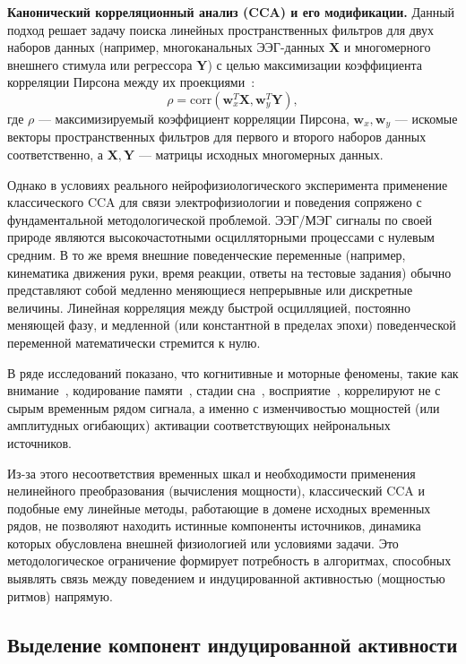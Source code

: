 \textbf{Канонический корреляционный анализ (CCA) и его модификации.} 
Данный подход решает задачу поиска линейных пространственных фильтров для двух наборов данных (например, многоканальных ЭЭГ-данных $\mathbf{X}$ и многомерного внешнего стимула или регрессора $\mathbf{Y}$) с целью максимизации коэффициента корреляции Пирсона между их проекциями~\cite{thompson1984canonical}:
\begin{equation}
	\rho = \text{corr}(\mathbf{w}_x^T \mathbf{X}, \mathbf{w}_y^T \mathbf{Y}),
\end{equation}
где $\rho$ --- максимизируемый коэффициент корреляции Пирсона, $\mathbf{w}_x, \mathbf{w}_y$ --- искомые векторы пространственных фильтров для первого и второго наборов данных соответственно, а $\mathbf{X}, \mathbf{Y}$ --- матрицы исходных многомерных данных.

Однако в условиях реального нейрофизиологического эксперимента применение классического CCA для связи электрофизиологии и поведения сопряжено с фундаментальной методологической проблемой. ЭЭГ/МЭГ сигналы по своей природе являются высокочастотными осцилляторными процессами с нулевым средним. В то же время внешние поведенческие переменные (например, кинематика движения руки, время реакции, ответы на тестовые задания) обычно представляют собой медленно меняющиеся непрерывные или дискретные величины. Линейная корреляция между быстрой осцилляцией, постоянно меняющей фазу, и медленной (или константной в пределах эпохи) поведенческой переменной математически стремится к нулю.

В ряде исследований показано, что когнитивные и моторные феномены, такие как внимание~\cite{basar1997alpha}, кодирование памяти~\cite{jensen2007human}, стадии сна~\cite{darchia2007kinetics}, восприятие~\cite{gonzalez2005prediction}, коррелируют не с сырым временным рядом сигнала, а именно с изменчивостью мощностей (или амплитудных огибающих) активации соответствующих нейрональных источников.

Из-за этого несоответствия временных шкал и необходимости применения нелинейного преобразования (вычисления мощности), классический CCA и подобные ему линейные методы, работающие в домене исходных временных рядов, не позволяют находить истинные компоненты источников, динамика которых обусловлена внешней физиологией или условиями задачи. Это методологическое ограничение формирует потребность в алгоритмах, способных выявлять связь между поведением и индуцированной активностью (мощностью ритмов) напрямую.

\subsection{Выделение компонент индуцированной активности}
\label{sec:induced_activity}

